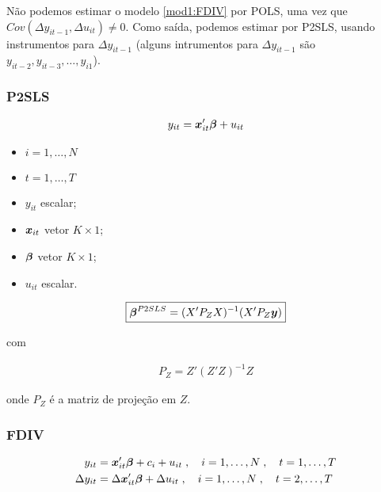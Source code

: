 \documentclass[11pt, oneside, a4paper, article]{article}
\numberwithin{equation}{section}
\begin{document}
\begin{description}
	Não podemos estimar o modelo \eqref{mod1:FDIV} por POLS, uma vez que $Cov(\Delta y_{it-1}, \Delta u_{it} ) \neq 0$.
	Como saída, podemos estimar por P2SLS, usando instrumentos para $\Delta y_{it-1}$ (alguns intrumentos para $\Delta y_{it-1}$ são $y_{it-2}, y_{it-3}, \dots, y_{i1}$).

	\subsubsection{P2SLS}

	\vspace{-1 em}
	\begin{align*}
		y_{it} = \boldsymbol{x}_{it}' \boldsymbol{\beta} + u_{it}
	\end{align*}

	\begin{itemize}\itemsep0pt
		\item $i = 1, \dots, N$
		\item $t = 1, \dots, T$
		\item $y_{it}$ escalar;
		\item $\boldsymbol{x}_{it}$  vetor $K \times 1$;
		\item $\boldsymbol{\beta}$ vetor $K \times 1$;
		\item $u_{it}$ escalar.
	\end{itemize}

	\vspace{-1 em}
	\begin{align*}
		\boxed{
		\boldsymbol{\beta}^{P2SLS} =  ( X' P_{Z} X )^{-1} ( X' P_{Z} \boldsymbol{y} ) }
	\end{align*}

	\noindent
	com

	\vspace{-1 em}
	\begin{align*}
		\boxed{P_{Z} = Z'(Z'Z)^{-1}Z }
	\end{align*}

	\noindent
	onde
	$P_{Z}$ é a matriz de projeção em $Z$.

	\subsubsection{FDIV}

	\vspace{-1 em}
	\begin{align*}
		y_{it} &= \boldsymbol{x}_{it}' \boldsymbol{\beta} + c_{i} + u_{it}
		\; , \quad i = 1, \dots, N
		\; , \quad t = 1, \dots, T
		\\
		\Delta y_{it} &= \Delta \boldsymbol{x}_{it}' \boldsymbol{\beta} + \Delta u_{it}
		\; , \quad i = 1, \dots, N
		\; , \quad t = 2, \dots, T
	\end{align*}


\end{description}
\end{document}
